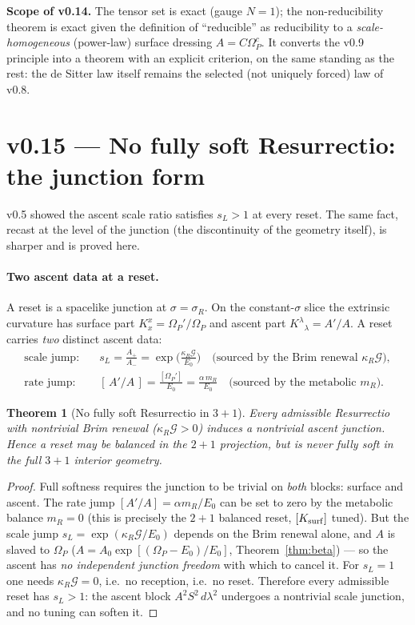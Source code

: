 \documentclass[11pt,a4paper]{article}
\theoremstyle{plain}
\newtheorem{theorem}{Theorem}
\theoremstyle{definition}
\theoremstyle{remark}
\begin{document}
\textbf{Scope of v0.14.} The tensor set is exact (gauge $N=1$); the non-reducibility theorem is exact
given the definition of ``reducible'' as reducibility to a \emph{scale-homogeneous} (power-law)
surface dressing $A=C\Omega_P^c$. It converts
the v0.9 principle into a theorem with an explicit criterion, on the same standing as the rest: the
de Sitter law itself remains the selected (not uniquely forced) law of v0.8.

\FloatBarrier
\section*{v0.15 --- No fully soft Resurrectio: the junction form}
v0.5 showed the ascent scale ratio satisfies $s_L>1$ at every reset. The same fact, recast at the
level of the junction (the discontinuity of the geometry itself), is sharper and is proved here.

\paragraph{Two ascent data at a reset.} A reset is a spacelike junction at $\sigma=\sigma_R$. On the
constant-$\sigma$ slice the extrinsic curvature has surface part $K^x_x=\Omega_P'/\Omega_P$ and ascent
part $K^\lambda{}_\lambda=A'/A$. A reset carries \emph{two} distinct ascent data:
\begin{align}
\text{scale jump:}\quad & s_L=\frac{A_+}{A_-}=\exp\!\Big(\frac{\kappa_R\mathcal G}{E_0}\Big)
\quad\text{(sourced by the Brim renewal }\kappa_R\mathcal G\text{)},\\
\text{rate jump:}\quad & [\,A'/A\,]=\frac{[\Omega_P']}{E_0}=\frac{\alpha\,m_R}{E_0}
\quad\text{(sourced by the metabolic }m_R\text{)}.
\end{align}

\begin{theorem}[No fully soft Resurrectio in $3{+}1$]\label{thm:nosoft}
Every admissible Resurrectio with nontrivial Brim renewal ($\kappa_R\mathcal G>0$) induces a nontrivial
ascent junction. Hence a reset may be balanced in the $2{+}1$ projection, but is never fully soft in
the full $3{+}1$ interior geometry.
\end{theorem}

\begin{proof}
Full softness requires the junction to be trivial on \emph{both} blocks: surface and ascent. The rate
jump $[A'/A]=\alpha m_R/E_0$ can be set to zero by the metabolic balance $m_R=0$ (this is precisely the
$2{+}1$ balanced reset, $[K_{\rm surf}]$ tuned). But the scale jump
$s_L=\exp(\kappa_R\mathcal G/E_0)$ depends on the Brim renewal alone, and $A$ is slaved to $\Omega_P$
($A=A_0\exp[(\Omega_P-E_0)/E_0]$, Theorem~\ref{thm:beta}) --- so the ascent has \emph{no independent
junction freedom} with which to cancel it. For $s_L=1$ one needs $\kappa_R\mathcal G=0$, i.e.\ no
reception, i.e.\ no reset. Therefore every admissible reset has $s_L>1$: the ascent block
$A^2S^2\,d\lambda^2$ undergoes a nontrivial scale junction, and no tuning can soften it.
\end{proof}
\end{document}
